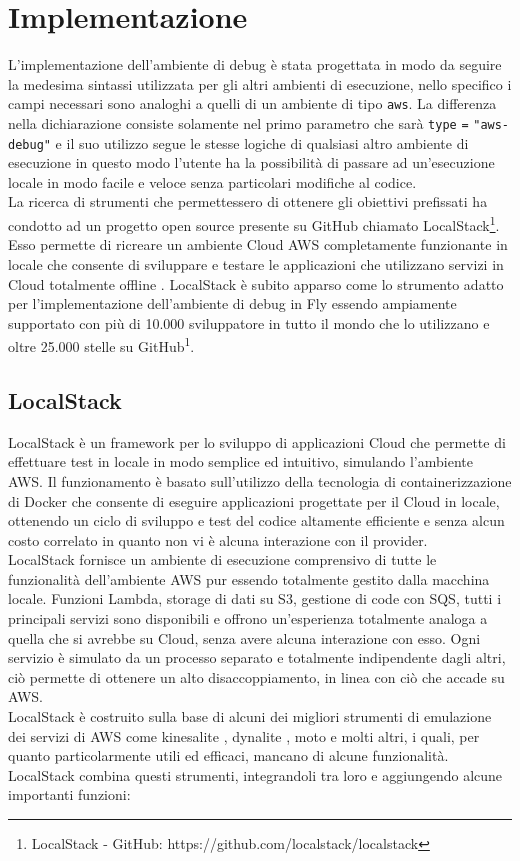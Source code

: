\section{Implementazione}
L’implementazione dell’ambiente di debug è stata progettata in modo da seguire la medesima sintassi utilizzata per gli altri ambienti di esecuzione, nello specifico i campi necessari sono analoghi a quelli di un ambiente di tipo \verb|aws|. La differenza nella dichiarazione consiste solamente nel primo parametro che sarà \verb|type| \verb|=| \verb|"aws-debug"| e il suo utilizzo segue le stesse logiche di qualsiasi altro ambiente di esecuzione in questo modo l'utente ha la possibilità di passare ad un’esecuzione locale in modo facile e veloce senza particolari modifiche al codice.\\
La ricerca di strumenti che permettessero di ottenere gli obiettivi prefissati ha condotto ad un progetto open source presente su GitHub chiamato LocalStack\footnote{LocalStack - GitHub: https://github.com/localstack/localstack}. Esso permette di ricreare un ambiente Cloud AWS completamente funzionante in locale che consente di sviluppare e testare le applicazioni che utilizzano servizi in Cloud totalmente offline \cite{LocalStack}. LocalStack è subito apparso come lo strumento adatto per l’implementazione dell’ambiente di debug in Fly essendo ampiamente supportato con più di 10.000 sviluppatore in tutto il mondo che lo utilizzano \cite{LocalStack} e oltre 25.000 stelle su GitHub\textsuperscript{1}.

\subsection{LocalStack}
LocalStack è un framework per lo sviluppo di applicazioni Cloud che permette di effettuare test in locale in modo semplice ed intuitivo, simulando l’ambiente AWS. Il funzionamento è basato sull'utilizzo della tecnologia di containerizzazione di Docker \cite{docker} che consente di eseguire applicazioni progettate per il Cloud in locale, ottenendo un ciclo di sviluppo e test del codice altamente efficiente e senza alcun costo correlato in quanto non vi è alcuna interazione con il provider.\\
LocalStack fornisce un ambiente di esecuzione comprensivo di tutte le funzionalità dell’ambiente AWS pur essendo totalmente gestito dalla macchina locale. Funzioni Lambda, storage di dati su S3, gestione di code con SQS, tutti i principali servizi sono disponibili e offrono un’esperienza totalmente analoga a quella che si avrebbe su Cloud, senza avere alcuna interazione con esso. Ogni servizio è simulato da un processo separato e totalmente indipendente dagli altri, ciò permette di ottenere un alto disaccoppiamento, in linea con ciò che accade su AWS.\\
LocalStack è costruito sulla base di alcuni dei migliori strumenti di emulazione dei servizi di AWS come kinesalite \cite{kinesalite}, dynalite \cite{dynalite}, moto \cite{moto} e molti altri, i quali, per quanto particolarmente utili ed efficaci, mancano di alcune funzionalità. LocalStack combina questi strumenti, integrandoli tra loro e aggiungendo alcune importanti funzioni:

